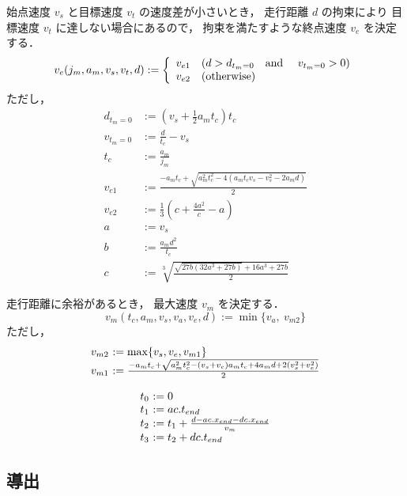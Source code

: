 \documentclass[a5paper]{ltjsarticle}
\begin{document}
始点速度 $v_s$ と目標速度 $v_t$ の速度差が小さいとき，
走行距離 $d$ の拘束により
目標速度 $v_t$ に達しない場合にあるので，
拘束を満たすような終点速度 $v_e$ を決定する．
\begin{align}
    v_e(j_m, a_m, v_s, v_t, d) :=
    \left\{\begin{array}{ll}
        v_{e1} & (d > d_{t_m=0} \mbox{\quad and \quad} v_{t_m=0} > 0)
        \\
        v_{e2} & (\mbox{otherwise})
    \end{array}\right.
\end{align}
ただし，
\begin{align}
    d_{t_m=0} & := \left( v_s + \frac{1}{2} a_m t_c \right) t_c
    \\
    v_{t_m=0} & := \frac{d}{t_c} - v_s
    \\
    t_c       & := \frac{a_m}{j_m}
    \\
    v_{e1}    & := \frac{-a_m t_c + \sqrt{a_m^2 t_c^2-4(a_m t_c v_s - v_s^2 - 2a_m d)}}{2}
    \\
    v_{e2}    & := \frac{1}{3}\left(c +\frac{4a^2}{c} -a \right)
    \\
    a         & := v_s
    \\
    b         & :=                       \frac{a_md^2}{t_c}
    \\
    c         & :=                       \sqrt[3]{\frac{\sqrt{27b(32a^3+27b)} + 16a^3+27b}{2}}
\end{align}

走行距離に余裕があるとき，
最大速度 $v_m$ を決定する．
$$
    v_m(t_c, a_m, v_s, v_a, v_e, d) := \min\{v_a,~v_{m2}\}
$$
ただし，
$$
    \begin{array}{l@{~}l}
        v_{m2} & := \max\{v_s, v_e, v_{m1}\}                                                   \\
        v_{m1} & := \frac{-a_mt_c + \sqrt{a_m^2t_c^2-(v_s+v_e)a_mt_c+4a_md+2(v_s^2+v_e^2)}}{2}
    \end{array}
$$

$$
    \begin{array}{l@{~}l}
        t_0 & := 0
        \\
        t_1 & := ac.t_{end}
        \\
        t_2 & := t_1 +             \frac{d - ac.x_{end} - dc.x_{end}}{v_m}
        \\
        t_3 & := t_2 + dc.t_{end}
    \end{array}
$$

\subsection{導出}
\end{document}
